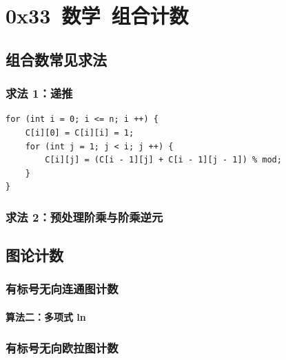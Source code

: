 \documentclass{article}
\begin{document}


\section{0x33\ 数学\ 组合计数}

\subsection{组合数常见求法}

\subsubsection{求法 1：递推}

\begin{verbatim}
for (int i = 0; i <= n; i ++) {
    C[i][0] = C[i][i] = 1;
    for (int j = 1; j < i; j ++) {
        C[i][j] = (C[i - 1][j] + C[i - 1][j - 1]) % mod;
    }
}
\end{verbatim}

\subsubsection{求法 2：预处理阶乘与阶乘逆元}


\subsection{图论计数}

\subsubsection{有标号无向连通图计数}

\paragraph{算法二：多项式 ln}


\subsubsection{有标号无向欧拉图计数}
\end{document}
